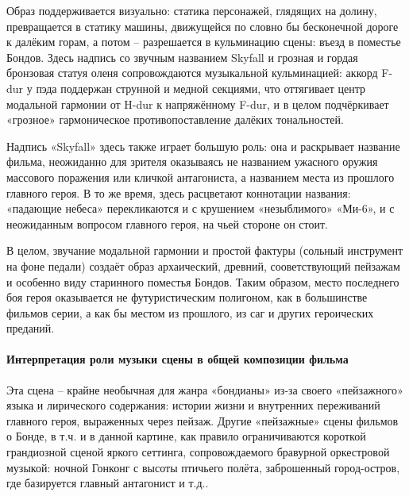 Образ поддерживается визуально: статика персонажей, глядящих на долину, превращается в статику машины, движущейся по словно бы бесконечной дороге к далёким горам, а потом -- разрешается в кульминацию сцены: въезд в поместье Бондов.
Здесь надпись со звучным названием Skyfall и грозная и гордая бронзовая статуя оленя сопровождаются музыкальной кульминацией: аккорд F-dur у пэда поддержан струнной и медной секциями, что оттягивает центр модальной гармонии от H-dur к напряжённому F-dur, и в целом подчёркивает «грозное» гармоническое противопоставление далёких тональностей.

Надпись «Skyfall» здесь также играет большую роль: она и раскрывает название фильма, неожиданно для зрителя оказываясь не названием ужасного оружия массового поражения или кличкой антагониста, а названием места из прошлого главного героя.
В то же время, здесь расцветают коннотации названия: «падающие небеса» перекликаются и с крушением «незыблимого» «Ми-6», и с неожиданным вопросом главного героя, на чьей стороне он стоит.

В целом, звучание модальной гармонии и простой фактуры (сольный инструмент на фоне педали) создаёт образ архаический, древний, сооветствующий пейзажам и особенно виду старинного поместья Бондов.
Таким образом, место последнего боя героя оказывается не футуристическим полигоном, как в большинстве фильмов серии, а как бы местом из прошлого, из саг и других героических преданий.

\paragraph{Интерпретация роли музыки сцены в общей композиции фильма}\label{ux438ux43dux442ux435ux440ux43fux440ux435ux442ux430ux446ux438ux44f-ux440ux43eux43bux438-ux43cux443ux437ux44bux43aux438-ux441ux446ux435ux43dux44b-ux432-ux43eux431ux449ux435ux439-ux43aux43eux43cux43fux43eux437ux438ux446ux438ux438-ux444ux438ux43bux44cux43cux430-5}

Эта сцена -- крайне необычная для жанра «бондианы» из-за своего «пейзажного» языка и лирического содержания: истории жизни и внутренних переживаний главного героя, выраженных через пейзаж.
Другие «пейзажные» сцены фильмов о Бонде, в т.ч. и в данной картине, как правило ограничиваются короткой грандиозной сценой яркого сеттинга, сопровождаемого бравурной оркестровой музыкой: ночной Гонконг с высоты птичьего полёта, заброшенный город-остров, где базируется главный антагонист и т.д..

